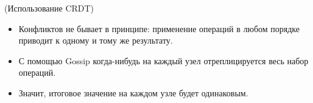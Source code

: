 \begin{algorithm}(Использование CRDT)
    \begin{itemize}
        \item Конфликтов не бывает в принципе: применение операций в любом порядке приводит к одному и тому же результату.
        \item С помощью Gossip когда-нибудь на каждый узел отреплицируется весь набор операций.
        \item Значит, итоговое значение на каждом узле будет одинаковым.
    \end{itemize}

\end{algorithm}

